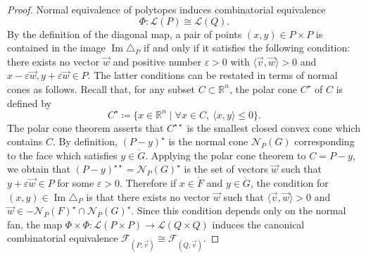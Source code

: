 \documentclass[10pt,a4paper]{amsart}
\numberwithin{equation}{section}\providecommand{\No}{}
\let\mathcal\mathscr
\theoremstyle{plain}
\theoremstyle{definition}
\newcommand{\RR}{\mathbb{R}}
\newcommand{\La}{\mathcal{L}}
\newcommand{\sF}{\mathcal{F}}
\newcommand{\ang}[1]{\langle #1\rangle}
\renewcommand{\No}{\mathcal{N}}
\DeclareMathOperator{\im}{\mathrm{Im}}
\begin{document}
\begin{proof}
Normal equivalence of polytopes induces combinatorial equivalence
\[
\Phi: \La(P)\cong\La(Q).
\]
By the definition of the diagonal map, a pair of points $(x, y)\in P\times P$ is contained in the image $\im \triangle_P$ if and only if it satisfies the following condition:
there exists no vector $\vec w$ and positive number $\varepsilon >0$ with $\ang{\vec v, \vec w}>0$ and $x-\varepsilon \vec w, y+\varepsilon\vec w\in P$.
The latter conditions can be restated in terms of normal cones as follows. Recall that,
for any subset $C \subset \RR^n$, the polar cone $C^\star$ of $C$ is defined by
\[
C^\star \coloneqq\{ x\in \RR^n\mid \forall x\in C, \ \ang{x, y} \leq 0\}.
\]
The polar cone theorem asserts that $C^{\star \star}$ is the smallest closed convex cone which contains $C$.
By definition, $(P-y)^\star$ is the normal cone $\No_P(G)$ corresponding to the face which satisfies $y\in \mathring G$.
Applying the polar cone theorem to $C= P-y$, we obtain that $(P-y)^{\star\star} = \No_P(G)^\star$ is the set of vectors $\vec w$ such that $y+\varepsilon\vec w \in P$ for some $\varepsilon >0$.
Therefore if $x\in \mathring F$ and $y\in \mathring G$, the condition for $(x, y)\in \im \triangle_P$ is that
there exists no vector $\vec w$ such that
$\ang{\vec v, \vec w}>0$ and $\vec w\in -\No_P(F)^\star\cap \No_P(G)^\star$.
Since this condition depends only on the normal fan,
the map $\Phi\times \Phi: \La(P\times P)\to \La(Q\times Q)$ induces the canonical combinatorial equivalence $\sF_{(P, \vec v)}\cong \sF_{(Q, \vec v)}$.
\end{proof}
\end{document}
